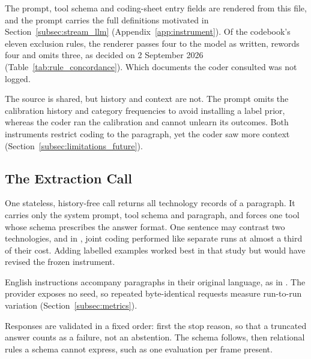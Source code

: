 The prompt, tool schema and coding-sheet entry fields are rendered from this file, and the prompt carries the full definitions motivated in Section~\ref{subsec:stream_llm} (Appendix~\ref{app:instrument}). Of the codebook's eleven exclusion rules, the renderer passes four to the model as written, rewords four and omits three, as decided on 2 September 2026 (Table~\ref{tab:rule_concordance}). Which documents the coder consulted was not logged.



The source is shared, but history and context are not. The prompt omits the calibration history and category frequencies to avoid installing a label prior, whereas the coder ran the calibration and cannot unlearn its outcomes. Both instruments restrict coding to the paragraph, yet the coder saw more context (Section~\ref{subsec:limitations_future}).

\subsection{The Extraction Call}\label{subsec:extraction_call}

One stateless, history-free call returns all technology records of a paragraph. It carries only the system prompt, tool schema and paragraph, and forces one tool whose schema prescribes the answer format. One sentence may contrast two technologies, and in \textcite[p.~9]{lupo2024humanlevelcoding}, joint coding performed like separate runs at almost a third of their cost. Adding labelled examples worked best in that study but would have revised the frozen instrument.

English instructions accompany paragraphs in their original language, as in \textcite[pp.~1184, 1186]{toernberg2025outperform}. The provider exposes no seed, so repeated byte-identical requests measure run-to-run variation (Section~\ref{subsec:metrics}).

Responses are validated in a fixed order: first the stop reason, so that a truncated answer counts as a failure, not an abstention. The schema follows, then relational rules a schema cannot express, such as one evaluation per frame present.
